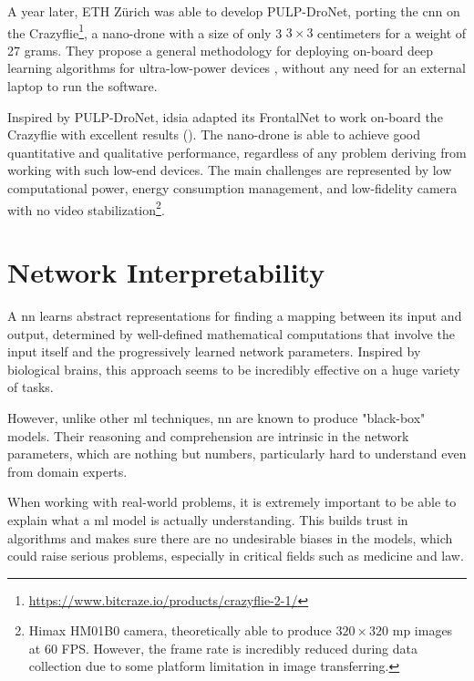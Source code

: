 A year later, ETH Zürich was able to develop PULP-DroNet, porting the \gls{cnn} on the Crazyflie\footnote{\url{https://www.bitcraze.io/products/crazyflie-2-1/}}, a nano-drone with a size of only 3 $3 \times 3$ centimeters for a weight of 27 grams. They propose a general methodology for deploying on-board deep learning algorithms for ultra-low-power devices \cite{palossi2019pulpdronetIoTJ}, without any need for an external laptop to run the software.

\medskip

Inspired by PULP-DroNet, \gls{idsia} adapted its FrontalNet to work on-board the Crazyflie with excellent results (\cite{zimmerman2020thesis}). The nano-drone is able to achieve good quantitative and qualitative performance, regardless of any problem deriving from working with such low-end devices. The main challenges are represented by low computational power, energy consumption management, and low-fidelity camera with no video stabilization\footnote{Himax HM01B0 camera, theoretically able to produce $320 \times 320$ \gls{mp} images at 60 FPS. However, the frame rate is incredibly reduced during data collection due to some platform limitation in image transferring.}.




\section{Network Interpretability}
\label{sec:network-interpretability}


A \gls{nn} learns abstract representations for finding a mapping between its input and output, determined by well-defined mathematical computations that involve the input itself and the progressively learned network parameters. Inspired by biological brains, this approach seems to be incredibly effective on a huge variety of tasks.

\medskip 

However, unlike other \gls{ml} techniques, \gls{nn} are known to produce "black-box" models. Their reasoning and comprehension are intrinsic in the network parameters, which are nothing but numbers, particularly hard to understand even from domain experts. 

When working with real-world problems, it is extremely important to be able to explain what a \gls{ml} model is actually understanding. This builds trust in algorithms and makes sure there are no undesirable biases in the models, which could raise serious problems, especially in critical fields such as medicine and law.

